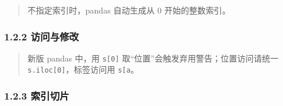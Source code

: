 \begin{Shaded}
\begin{Highlighting}[]
\end{Highlighting}
\end{Shaded}

\begin{quote}
不指定索引时，pandas 自动生成从 0 开始的整数索引。
\end{quote}

\subsubsection{1.2.2 访问与修改}\label{ux8bbfux95eeux4e0eux4feeux6539}

\begin{Shaded}
\begin{Highlighting}[]
\NormalTok{(s3[}\NormalTok{])       }
\NormalTok{(s3.iloc[}\NormalTok{])    }

\NormalTok{s3[}\NormalTok{] }\OperatorTok{=}          
\NormalTok{s3.iloc[}\NormalTok{] }\OperatorTok{=}      
\end{Highlighting}
\end{Shaded}

\begin{Shaded}
\begin{Highlighting}[]
\end{Highlighting}
\end{Shaded}

\begin{quote}
新版 pandas 中，用 \texttt{s{[}0{]}}
取``位置''会触发弃用警告；位置访问请统一
\texttt{s.iloc{[}0{]}}，标签访问用
\texttt{s{[}\textquotesingle{}a\textquotesingle{}{]}}。
\end{quote}

\subsubsection{1.2.3 索引切片}\label{ux7d22ux5f15ux5207ux7247}

